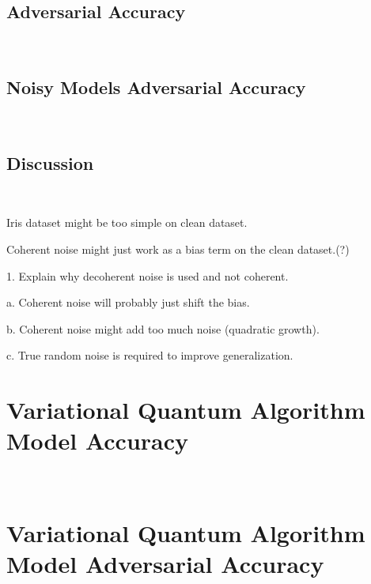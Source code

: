 \subsection{Adversarial Accuracy}\label{subsection:plus-minus-adv-acc} \

\subsection{Noisy Models Adversarial Accuracy}\label{subsection:plus-minus-noisy-adv-acc} \

\subsection{Discussion}\label{subsection:discussion} \

Iris dataset might be too simple on clean dataset.

Coherent noise might just work as a bias term on the clean dataset.(?) \


1.	Explain why decoherent noise is used and not coherent. \

  a. Coherent noise will probably just shift the bias. \

  b. Coherent noise might add too much noise (quadratic growth). \

  c. True random noise is required to improve generalization. \


\section{Variational Quantum Algorithm Model Accuracy}\label{section:vqa_accuracy} \


\section{Variational Quantum Algorithm Model Adversarial Accuracy}\label{section:vqa_adversarial_accuracy} \

